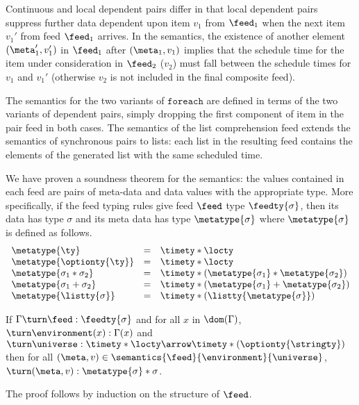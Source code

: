 Continuous and local dependent pairs differ in that local dependent
pairs suppress further data dependent upon item $v_1$ from $\feed_1$
when the next item $v_1'$ from feed $\feed_1$ arrives.  In the
semantics, the existence of another element $(\meta_1',v_1')$
in $\feed_1$ after $(\meta_1,v_1)$ implies that the 
schedule time for the item under consideration in $\feed_2$ ($v_2$) 
must fall between the schedule times for $v_1$ and $v_1'$
(otherwise $v_2$ is not included in the final composite feed). 

The semantics for the two variants of $\mathtt{foreach}$ are defined
in terms of the two variants of dependent pairs, simply dropping the
first component of item in the pair feed in both cases.  The semantics
of the list comprehension feed extends the semantics of synchronous
pairs to lists: each list in the resulting feed contains the elements
of the generated list with the same scheduled time.

We have proven a soundness theorem for the semantics: the values
contained in each feed are pairs of meta-data and data 
values with the appropriate type.  More specifically, if the feed typing
rules give feed $\feed$ type $\feedty{\sigma}$, 
then its data has type $\sigma$ and
its meta data has type $\metatype{\sigma}$ where $\metatype{\sigma}$ is
defined as follows.
\[
\begin {array} {lcl}
\metatype{\ty} & = & \timety * \locty \\
\metatype{\optionty{\ty}} & = & \timety * \locty \\
\metatype{\sigma_1 * \sigma_2} & = & \timety * (\metatype{\sigma_1} * \metatype{\sigma_2}) \\
\metatype{\sigma_1 + \sigma_2} & = & \timety * (\metatype{\sigma_1} + \metatype{\sigma_2}) \\
\metatype{\listty{\sigma}} & = & \timety * (\listty{\metatype{\sigma}}) \\
\end{array}
\]
\begin{theorem}
If $\Gamma \turn \feed : \feedty{\sigma}$ and
for all $x$ in $\dom(\Gamma)$, $\turn \environment(x) : \Gamma(x)$
and $\turn \universe : \timety * \locty \arrow \timety * (\optionty{\stringty})$
then
for all $(\meta,v) \in \semantics{\feed}{\environment}{\universe}$,
$\turn (\meta,v) : \metatype{\sigma} * \sigma$. 
\end{theorem}
The proof follows by induction on the structure of $\feed$.




